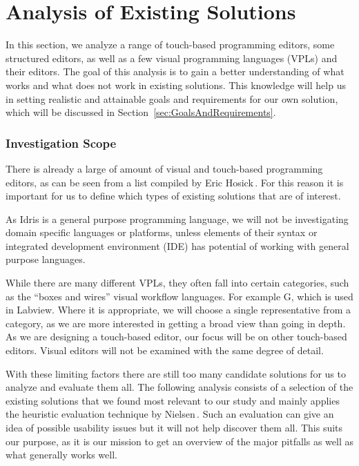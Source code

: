 \chapter{Analysis of Existing Solutions}
\label{sec:Analysis}
In this section, we analyze a range of touch-based programming editors, some structured editors, as well as a few visual programming languages (VPLs) and their editors.
The goal of this analysis is to gain a better understanding of what works and what does not work in existing solutions.
This knowledge will help us in setting realistic and attainable goals and requirements for our own solution, which will be discussed in Section~\ref{sec:GoalsAndRequirements}.

\subsection{Investigation Scope}
There is already a large of amount of visual and touch-based programming editors, as can be seen from a list compiled by Eric Hosick\,\cite{hosick2014}.
For this reason it is important for us to define which types of existing solutions that are of interest.

As Idris is a general purpose programming language, we will not be investigating domain specific languages or platforms, unless elements of their syntax or integrated development environment (IDE) has potential of working with general purpose languages.

While there are many different VPLs, they often fall into certain categories, such as the ``boxes and wires'' visual workflow languages. For example G, which is used in Labview.
Where it is appropriate, we will choose a single representative from a category, as we are more interested in getting a broad view than going in depth.
As we are designing a touch-based editor, our focus will be on other touch-based editors. Visual editors will not be examined with the same degree of detail.

With these limiting factors there are still too many candidate solutions for us to analyze and evaluate them all. 
The following analysis consists of a selection of the existing solutions that we found most relevant to our study and mainly applies the heuristic evaluation technique by Nielsen\,\cite{nielsen1990heuristic}. 
Such an evaluation can give an idea of possible usability issues but it will not help discover them all. 
This suits our purpose, as it is our mission to get an overview of the major pitfalls as well as what generally works well.

